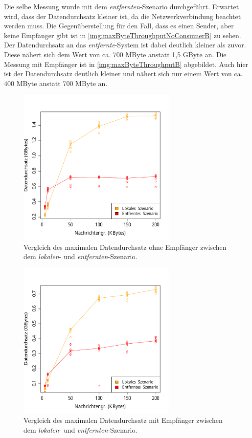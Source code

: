 Die selbe Messung wurde mit dem \textit{entfernten}-Szenario durchgeführt. Erwartet wird, dass der Datendurchsatz kleiner ist, da die Netzwerkverbindung beachtet werden muss. 
Die Gegenüberstellung für den Fall, dass es einen Sender, aber keine Empfänger gibt ist in \autoref{img:maxByteThroughputNoConsumerB} zu sehen. Der Datendurchsatz an das \textit{entfernte}-System ist dabei deutlich kleiner als zuvor. Diese nähert sich dem Wert von ca. 700 MByte anstatt 1,5 GByte an. Die Messung mit Empfänger ist in \autoref{img:maxByteThroughputB} abgebildet. Auch hier ist der Datendurchsatz deutlich kleiner und nähert sich nur einem Wert von ca. 400 MByte anstatt 700 MByte an.
\begin{figure}
\center
 \includegraphics[width=0.7\textwidth]{images/measurement/rate-limit-unlimited-no-consumer-AvsB.pdf}
  \caption{Vergleich des maximalen Datendurchsatz ohne Empfänger zwischen dem \textit{lokalen}- und  \textit{entfernten}-Szenario.}
  \label{img:maxByteThroughputNoConsumerB}
\end{figure}
\begin{figure}
\center
 \includegraphics[width=0.7\textwidth]{images/measurement/rate-limit-unlimited-AvsB.pdf}
  \caption{Vergleich des maximalen Datendurchsatz mit Empfänger zwischen dem \textit{lokalen}- und  \textit{entfernten}-Szenario.}
  \label{img:maxByteThroughputB}
\end{figure}
